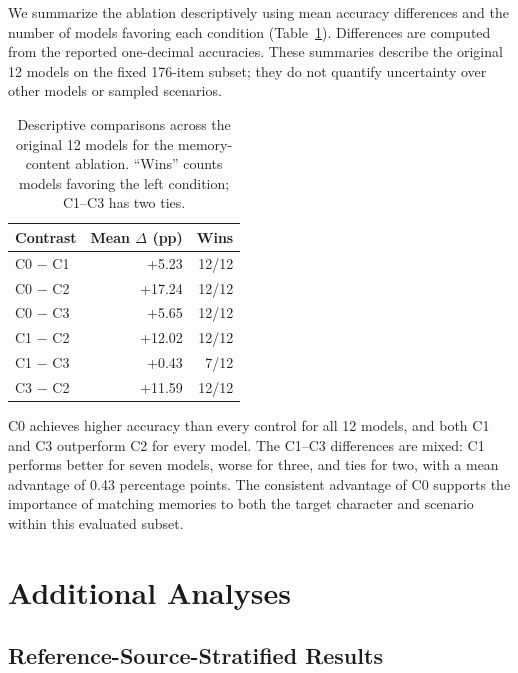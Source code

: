 \documentclass[11pt]{article}
\begin{document}
We summarize the ablation descriptively using mean accuracy differences and the number of models favoring each condition (Table~\ref{tab:memory_ablation_stats}). Differences are computed from the reported one-decimal accuracies. These summaries describe the original 12 models on the fixed 176-item subset; they do not quantify uncertainty over other models or sampled scenarios.

\begin{table}[t]
\centering
\caption{Descriptive comparisons across the original 12 models for the memory-content ablation. ``Wins'' counts models favoring the left condition; C1--C3 has two ties.}
\label{tab:memory_ablation_stats}
\setlength{\tabcolsep}{6pt}
\small
\begin{tabular}{lrr}
\toprule
\textbf{Contrast} & \textbf{Mean $\Delta$ (pp)} & \textbf{Wins} \\
\midrule
C0 $-$ C1 & +5.23 & 12/12 \\
C0 $-$ C2 & +17.24 & 12/12 \\
C0 $-$ C3 & +5.65 & 12/12 \\
C1 $-$ C2 & +12.02 & 12/12 \\
C1 $-$ C3 & +0.43 & 7/12 \\
C3 $-$ C2 & +11.59 & 12/12 \\
\bottomrule
\end{tabular}
\end{table}

C0 achieves higher accuracy than every control for all 12 models, and both C1 and C3 outperform C2 for every model. The C1--C3 differences are mixed: C1 performs better for seven models, worse for three, and ties for two, with a mean advantage of 0.43 percentage points. The consistent advantage of C0 supports the importance of matching memories to both the target character and scenario within this evaluated subset.

\section{Additional Analyses}
\label{app:additional_analyses}

\subsection{Reference-Source-Stratified Results}
\label{app:gt_source_results}
\end{document}
